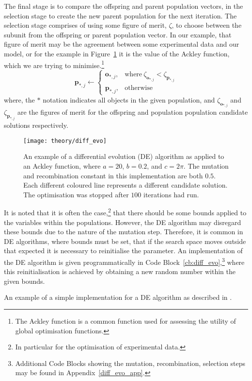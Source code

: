 The final stage is to compare the offspring and parent population vectors, in the selection stage to create the new parent population for the next iteration.
The selection stage comprises of using some figure of merit, $\zeta$, to choose between the subunit from the offspring or parent population vector.
In our example, that figure of merit may be the agreement between some experimental data and our model, or for the example in Figure~\ref{fig:diff_evo} it is the value of the Ackley function,\autocite{ackley_connectionist_1987} which we are trying to minimise.\footnote{The Ackley function is a common function used for assessing the utility of global optimisation functions.}
%
\begin{equation}
    \mathbf{p}_{*,j} \leftarrow
    \begin{cases}
        \mathbf{o}_{*,j}, & \text{where}\ \zeta_{\mathbf{o}_{*,j}} < \zeta_{\mathbf{p}_{*,j}} \\
        \mathbf{p}_{*,j}, & \text{otherwise}
    \end{cases}
\end{equation}
%
where, the $*$ notation indicates all objects in the given population, and $\zeta_{\mathbf{o}_{*,j}}$ and $\zeta_{\mathbf{p}_{*,j}}$ are the figures of merit for the offspring and population population candidate solutions respectively.
%
\begin{figure}
    \centering
    \texttt{[image: theory/diff\_evo]}
    \caption{An example of a differential evolution (DE) algorithm as applied to an Ackley function, where $a=20$, $b=0.2$, and $c=2\pi$. The mutation and recombination constant in this implementation are both $0.5$. Each different coloured line represents a different candidate solution. The optimisation was stopped after $100$ iterations had run.}
    \label{fig:diff_evo}
\end{figure}
%

It is noted that it is often the case,\footnote{In particular for the optimisation of experimental data.} that there should be some bounds applied to the variables within the populations.
However, the DE algorithm may disregard these bounds due to the nature of the mutation step.
Therefore, it is common in DE algorithms, where bounds must be set, that if the search space moves outside that expected it is necessary to reinitialise the parameter.
An implementation of the DE algorithm is given programmatically in Code Block~\ref{cb:diff_evo},\footnote{Additional Code Blocks showing the mutation, recombination, selection steps may be found in Appendix~\ref{diff_evo_app}.} where this reinitialisation is achieved by obtaining a new random number within the given bounds.
%
\begin{listing}
    \centering
    \caption{An example of a simple implementation for a DE algorithm as described in \cite{bjorck_fitting_2011}.}
    
    \label{cb:diff_evo}
\end{listing}
%

